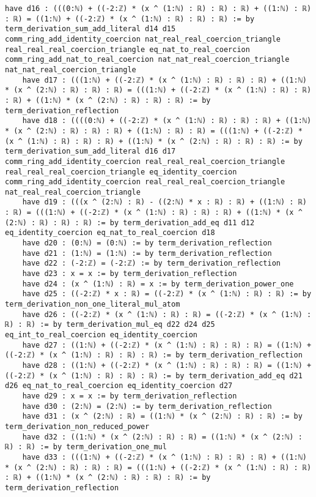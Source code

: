 \documentclass{article}
\begin{document}
\begin{tcolorbox}[colback=white!10, width=\linewidth]
\begin{lstlisting}[language=Lean4]
    have d16 : (((0:ℕ) + ((-2:ℤ) * (x ^ (1:ℕ) : ℝ) : ℝ) : ℝ) + ((1:ℕ) : ℝ) : ℝ) = ((1:ℕ) + ((-2:ℤ) * (x ^ (1:ℕ) : ℝ) : ℝ) : ℝ) := by term_derivation_sum_add_literal d14 d15 comm_ring_add_identity_coercion nat_real_real_coercion_triangle real_real_real_coercion_triangle eq_nat_to_real_coercion comm_ring_add_nat_to_real_coercion nat_nat_real_coercion_triangle nat_nat_real_coercion_triangle
    have d17 : (((1:ℕ) + ((-2:ℤ) * (x ^ (1:ℕ) : ℝ) : ℝ) : ℝ) + ((1:ℕ) * (x ^ (2:ℕ) : ℝ) : ℝ) : ℝ) = (((1:ℕ) + ((-2:ℤ) * (x ^ (1:ℕ) : ℝ) : ℝ) : ℝ) + ((1:ℕ) * (x ^ (2:ℕ) : ℝ) : ℝ) : ℝ) := by term_derivation_reflection
    have d18 : ((((0:ℕ) + ((-2:ℤ) * (x ^ (1:ℕ) : ℝ) : ℝ) : ℝ) + ((1:ℕ) * (x ^ (2:ℕ) : ℝ) : ℝ) : ℝ) + ((1:ℕ) : ℝ) : ℝ) = (((1:ℕ) + ((-2:ℤ) * (x ^ (1:ℕ) : ℝ) : ℝ) : ℝ) + ((1:ℕ) * (x ^ (2:ℕ) : ℝ) : ℝ) : ℝ) := by term_derivation_sum_add_literal d16 d17 comm_ring_add_identity_coercion real_real_real_coercion_triangle real_real_real_coercion_triangle eq_identity_coercion comm_ring_add_identity_coercion real_real_real_coercion_triangle nat_real_real_coercion_triangle
    have d19 : (((x ^ (2:ℕ) : ℝ) - ((2:ℕ) * x : ℝ) : ℝ) + ((1:ℕ) : ℝ) : ℝ) = (((1:ℕ) + ((-2:ℤ) * (x ^ (1:ℕ) : ℝ) : ℝ) : ℝ) + ((1:ℕ) * (x ^ (2:ℕ) : ℝ) : ℝ) : ℝ) := by term_derivation_add_eq d11 d12 eq_identity_coercion eq_nat_to_real_coercion d18
    have d20 : (0:ℕ) = (0:ℕ) := by term_derivation_reflection
    have d21 : (1:ℕ) = (1:ℕ) := by term_derivation_reflection
    have d22 : (-2:ℤ) = (-2:ℤ) := by term_derivation_reflection
    have d23 : x = x := by term_derivation_reflection
    have d24 : (x ^ (1:ℕ) : ℝ) = x := by term_derivation_power_one
    have d25 : ((-2:ℤ) * x : ℝ) = ((-2:ℤ) * (x ^ (1:ℕ) : ℝ) : ℝ) := by term_derivation_non_one_literal_mul_atom
    have d26 : ((-2:ℤ) * (x ^ (1:ℕ) : ℝ) : ℝ) = ((-2:ℤ) * (x ^ (1:ℕ) : ℝ) : ℝ) := by term_derivation_mul_eq d22 d24 d25 eq_int_to_real_coercion eq_identity_coercion
    have d27 : ((1:ℕ) + ((-2:ℤ) * (x ^ (1:ℕ) : ℝ) : ℝ) : ℝ) = ((1:ℕ) + ((-2:ℤ) * (x ^ (1:ℕ) : ℝ) : ℝ) : ℝ) := by term_derivation_reflection
    have d28 : ((1:ℕ) + ((-2:ℤ) * (x ^ (1:ℕ) : ℝ) : ℝ) : ℝ) = ((1:ℕ) + ((-2:ℤ) * (x ^ (1:ℕ) : ℝ) : ℝ) : ℝ) := by term_derivation_add_eq d21 d26 eq_nat_to_real_coercion eq_identity_coercion d27
    have d29 : x = x := by term_derivation_reflection
    have d30 : (2:ℕ) = (2:ℕ) := by term_derivation_reflection
    have d31 : (x ^ (2:ℕ) : ℝ) = ((1:ℕ) * (x ^ (2:ℕ) : ℝ) : ℝ) := by term_derivation_non_reduced_power
    have d32 : ((1:ℕ) * (x ^ (2:ℕ) : ℝ) : ℝ) = ((1:ℕ) * (x ^ (2:ℕ) : ℝ) : ℝ) := by term_derivation_one_mul
    have d33 : (((1:ℕ) + ((-2:ℤ) * (x ^ (1:ℕ) : ℝ) : ℝ) : ℝ) + ((1:ℕ) * (x ^ (2:ℕ) : ℝ) : ℝ) : ℝ) = (((1:ℕ) + ((-2:ℤ) * (x ^ (1:ℕ) : ℝ) : ℝ) : ℝ) + ((1:ℕ) * (x ^ (2:ℕ) : ℝ) : ℝ) : ℝ) := by term_derivation_reflection

\end{lstlisting}
\end{tcolorbox}
\end{document}
